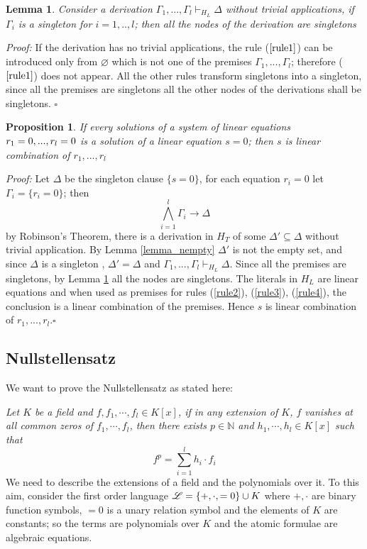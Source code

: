 \documentclass[a4paper,12pt,oneside]{book}
\newtheorem{proposition}[theorem]{Proposition}
\newtheorem{lemma}[theorem]{Lemma}
\newcommand*{\QED}{\hfill\ensuremath{\square}}
\let\emptyset\varnothing
\begin{document}
\begin{lemma}\label{lemma_onlysingletons}
Consider a derivation $\Gamma_1,...,\Gamma_l \vdash_{H_L} \Delta $ without trivial applications, 
if $\Gamma_i$ is a singleton for $i=1,..,l$; then all the nodes of the derivation are singletons
\end{lemma}
\textit{Proof:} If the derivation has no trivial applications, the rule ($\ref{rule1}$) can be introduced only from $\emptyset$ which is not one of the premises $\Gamma_1,...,\Gamma_l$; therefore ($\ref{rule1}$)  does not appear. All the other rules transform singletons into a singleton, since all the premises are singletons all the other nodes of the derivations shall be singletons. \QED

\begin{proposition} 
If every solutions of a system of linear equations $r_1=0,...,r_l=\nobreak 0$  is a solution of a linear equation $s=0$; then $s$ is linear combination of $r_1,...,r_l$
\end{proposition}

\textit{Proof:} Let $\Delta$ be the singleton clause $\{s=0\}$, for each equation $r_i=0$  let $\Gamma_i=\{r_i=0\}$; then 
$$ \bigwedge_{i=1}^l \Gamma_i \rightarrow \Delta $$
by Robinson's Theorem, there is a derivation in $H_T$ of some $\Delta' \subseteq\Delta$ without trivial application. By Lemma \ref{lemma_nempty} $\Delta'$ is not the empty set,  and  since $\Delta$ is a singleton , $\Delta'=\Delta$ and $ \Gamma_1,...,\Gamma_l \vdash_{H_L} \Delta  $.
Since all the premises are singletons, by Lemma \ref{lemma_onlysingletons} all the nodes are singletons. The literals in $H_L$ are linear equations and when used as premises for rules (\ref{rule2}), (\ref{rule3}), (\ref{rule4}), the conclusion is a linear combination of the premises. 
Hence $s$ is linear combination of $r_1,...,r_l$.\QED


\subsection*{Nullstellensatz} \label{null}


We want to prove the Nullstellensatz as stated here:

\noindent\textit{Let $K$ be a field and $f,f_1,\cdots, f_l \in K[{x}]$, if in any extension of $K$, $f$ vanishes at all common zeros of $f_1,\cdots, f_l$, then there exists $p\in \mathbb{N}$ and $h_1,\cdots, h_l \in K[{x}]$ such that} 
$$
f^p = \sum_{i=1}^l h_i \cdot f_i
$$
We need to describe the extensions of a field and the polynomials over it. To this aim, consider the first order language $\mathscr{L}=\{+,\cdot,=\nobreak 0\}\cup\nobreak K$ where $+,\cdot$ are binary function symbols, $=0$ is a unary relation symbol and the elements of $K$ are constants; so the terms are polynomials over $K$ and the atomic formulae are algebraic equations.
\end{document}
